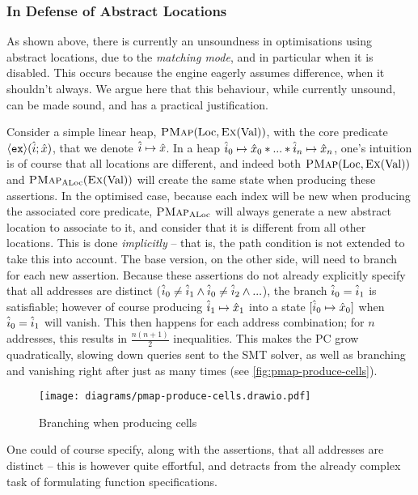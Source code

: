 \subsubsection{In Defense of Abstract Locations}

As shown above, there is currently an unsoundness in optimisations using abstract locations, due to the \emph{matching mode}, and in particular when it is disabled. This occurs because the engine eagerly assumes difference, when it shouldn't always. We argue here that this behaviour, while currently unsound, can be made sound, and has a practical justification.

Consider a simple linear heap, $\textsc{PMap}(\text{Loc}, \textsc{Ex}(\text{Val}))$, with the core predicate $\left<\texttt{ex}\right>\!(\hat{i};\hat{x})$, that we denote $\hat{i}\mapsto \hat{x}$. In a heap $\hat{i}_0\mapsto \hat{x}_0 * ... * \hat{i}_n\mapsto \hat{x}_n$, one's intuition is of course that all locations are different, and indeed both $\textsc{PMap}(\text{Loc}, \textsc{Ex}(\text{Val}))$ and $\textsc{PMap}_{\text{ALoc}}(\textsc{Ex}(\text{Val}))$ will create the same state when producing these assertions. In the optimised case, because each index will be new when producing the associated core predicate, $\textsc{PMap}_{\text{ALoc}}$ will always generate a new abstract location to associate to it, and consider that it is different from all other locations. This is done \emph{implicitly} -- that is, the path condition is not extended to take this into account. The base version, on the other side, will need to branch for each new assertion. Because these assertions do not already explicitly specify that all addresses are distinct (${\hat{i}_0 \neq \hat{i}_1 \land \hat{i}_0 \neq \hat{i}_2 \land ...}$), the branch $\hat{i}_0 = \hat{i}_1$ is satisfiable; however of course producing $\hat{i}_1 \mapsto \hat{x}_1$ into a state $[\hat{i}_0\mapsto \hat{x}_0]$ when $\hat{i}_0 = \hat{i}_1$ will vanish. This then happens for each address combination; for $n$ addresses, this results in $\frac{n(n+1)}{2}$ inequalities. This makes the PC grow quadratically, slowing down queries sent to the SMT solver, as well as branching and vanishing right after just as many times (see \autoref{fig:pmap-produce-cells}).

\begin{figure}
	\centering
	\texttt{[image: diagrams/pmap-produce-cells.drawio.pdf]}
	\caption{Branching when producing cells}
	\label{fig:pmap-produce-cells}
\end{figure}

One could of course specify, along with the assertions, that all addresses are distinct -- this is however quite effortful, and detracts from the already complex task of formulating function specifications.

